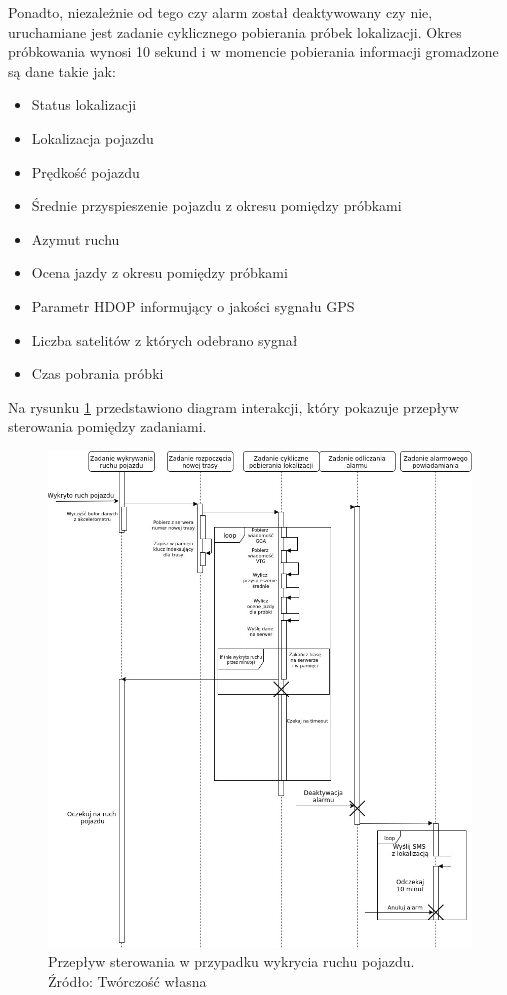Ponadto, niezależnie od tego czy alarm został deaktywowany czy nie, uruchamiane jest zadanie cyklicznego pobierania próbek lokalizacji. Okres próbkowania wynosi 10 sekund i w momencie pobierania informacji gromadzone są dane takie jak:

\begin{itemize}
\item Status lokalizacji
\item Lokalizacja pojazdu
\item Prędkość pojazdu
\item Średnie przyspieszenie pojazdu z okresu pomiędzy próbkami
\item Azymut ruchu
\item Ocena jazdy z okresu pomiędzy próbkami
\item Parametr HDOP informujący o jakości sygnału GPS
\item Liczba satelitów z których odebrano sygnał
\item Czas pobrania próbki
\end{itemize}

Na rysunku \ref{fig:image_soft_mainboard_control_flow} przedstawiono diagram interakcji, który pokazuje przepływ sterowania pomiędzy zadaniami. 


\begin{figure}[H]
	\centering
	\includegraphics[width=17cm]{img/software/mainboard/MainBoardStartTracking.jpg}
	\caption{Przepływ sterowania w przypadku wykrycia ruchu pojazdu. 
	\\Źródło: Twórczość własna}
	\label{fig:image_soft_mainboard_control_flow}
\end{figure}